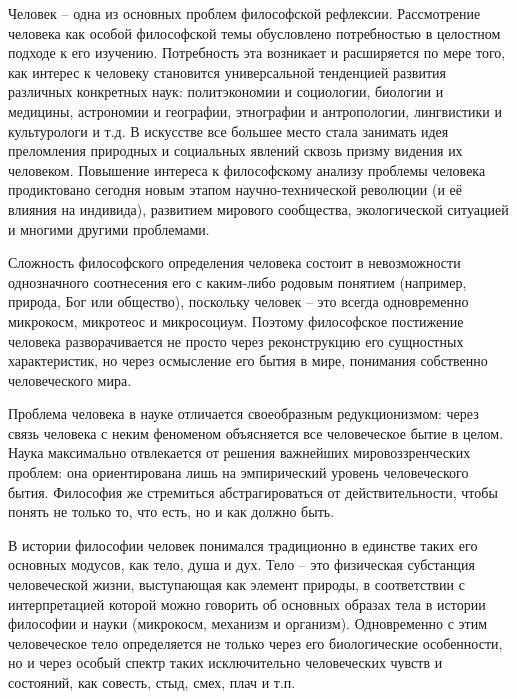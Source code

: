 
Человек -- одна из основных проблем философской рефлексии. Рассмотрение человека как особой философской темы 
обусловлено потребностью в целостном подходе к его изучению. Потребность эта возникает и расширяется по мере 
того, как интерес к человеку становится универсальной тенденцией развития различных конкретных наук: 
политэкономии и социологии, биологии и медицины, астрономии и географии, этнографии и антропологии, 
лингвистики и культурологи и т.д. В искусстве все большее место стала занимать идея преломления природных и 
социальных явлений сквозь призму видения их человеком. Повышение интереса к философскому анализу проблемы 
человека продиктовано сегодня новым этапом научно-технической революции (и её влияния на индивида), 
развитием мирового сообщества, экологической ситуацией и многими другими проблемами.

Сложность философского определения человека состоит в невозможности однозначного соотнесения его с каким-либо 
родовым понятием (например, природа, Бог или общество), поскольку человек -- это всегда одновременно 
микрокосм, микротеос и микросоциум. Поэтому философское постижение человека разворачивается не просто через 
реконструкцию его сущностных характеристик, но через осмысление его бытия в мире, понимания собственно 
человеческого мира.

Проблема человека в науке отличается своеобразным редукционизмом: через связь человека с неким феноменом 
объясняется все человеческое бытие в целом. Наука максимально отвлекается от решения важнейших 
мировоззренческих проблем: она ориентирована лишь на эмпирический уровень человеческого бытия. Философия же 
стремиться абстрагироваться от действительности, чтобы понять не только то, что есть, но и как должно быть.

В истории философии человек понимался традиционно в единстве таких его основных модусов, как тело, душа и 
дух. Тело -- это физическая субстанция человеческой жизни, выступающая как элемент природы, в соответствии с 
интерпретацией которой можно говорить об основных образах тела в истории философии и науки (микрокосм, 
механизм и организм). Одновременно с этим человеческое тело определяется не только через его биологические 
особенности, но и через особый спектр таких исключительно человеческих чувств и состояний, как совесть, стыд, 
смех, плач и т.п. 

